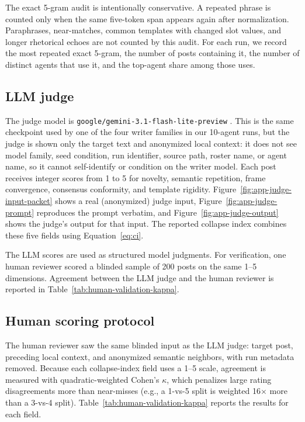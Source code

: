 The exact 5-gram audit is intentionally conservative. A repeated phrase is counted only when the same five-token span appears again after normalization. Paraphrases, near-matches, common templates with changed slot values, and longer rhetorical echoes are not counted by this audit. For each run, we record the most repeated exact 5-gram, the number of posts containing it, the number of distinct agents that use it, and the top-agent share among those uses.

\subsection{LLM judge}
\label{app:llm-judge-details}

The judge model is \texttt{google/gemini-3.1-flash-lite-preview} \citep{google2026gemini31flashlite}. This is the same checkpoint used by one of the four writer families in our 10-agent runs, but the judge is shown only the target text and anonymized local context: it does not see model family, seed condition, run identifier, source path, roster name, or agent name, so it cannot self-identify or condition on the writer model. Each post receives integer scores from 1 to 5 for novelty, semantic repetition, frame convergence, consensus conformity, and template rigidity. Figure~\ref{fig:app-judge-input-packet} shows a real (anonymized) judge input, Figure~\ref{fig:app-judge-prompt} reproduces the prompt verbatim, and Figure~\ref{fig:app-judge-output} shows the judge's output for that input. The reported collapse index combines these five fields using Equation~\ref{eq:ci}.

The LLM scores are used as structured model judgments. For verification, one human reviewer scored a blinded sample of 200 posts on the same 1--5 dimensions. Agreement between the LLM judge and the human reviewer is reported in Table~\ref{tab:human-validation-kappa}.

\subsection{Human scoring protocol}
\label{app:human-scoring-protocol}

The human reviewer saw the same blinded input as the LLM judge: target post, preceding local context, and anonymized semantic neighbors, with run metadata removed. Because each collapse-index field uses a 1--5 scale, agreement is measured with quadratic-weighted Cohen's $\kappa$, which penalizes large rating disagreements more than near-misses (e.g., a 1-vs-5 split is weighted 16$\times$ more than a 3-vs-4 split). Table~\ref{tab:human-validation-kappa} reports the results for each field.

